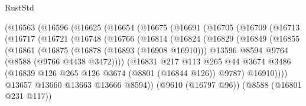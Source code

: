 \begin{lexlean}{RustStd}
\begin{coremodule}
                  (@16563
                    (@16596
                      (@16625
                        (@16654
                          (@16675
                            (@16691
                              (@16705
                                (@16709
                                  (@16713
                                    (@16717
                                      (@16721
                                        (@16748
                                          (@16766
                                            (@16814
                                              (@16824
                                                (@16829
                                                  (@16849
                                                    (@16855
                                                      (@16861
                                                        (@16875
                                                          (@16878 (@16893 (@16908 @16910)))
                                                          @13596
                                                          @8594
                                                          @9764
                                                          (@8588 (@9766 @4438 @3472))))
                                                      (@16831
                                                        @217
                                                        @113
                                                        @265
                                                        @44
                                                        @3674
                                                        @3486
                                                        (@16839
                                                          @126
                                                          @265
                                                          @126
                                                          @3674
                                                          (@8801 (@16844 @126))
                                                          @9787)
                                                        @16910))))
                                                @13657
                                                @13660
                                                @13663
                                                @13666
                                                @8594))
                                            (@9610 (@16797 @96))
                                            (@8588 (@16801 @231 @117))

\end{coremodule}
\end{lexlean}
